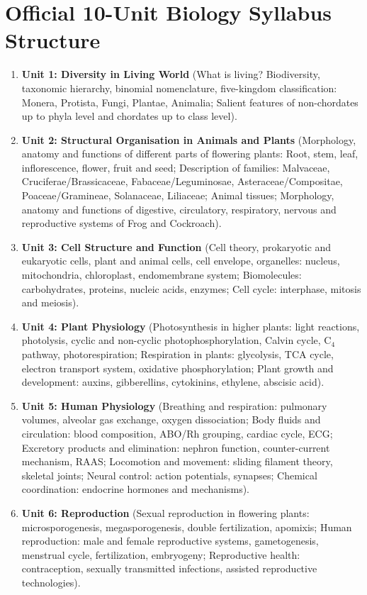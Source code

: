 \documentclass[10pt,twoside,openright]{book}
\begin{document}
\section*{Official 10-Unit Biology Syllabus Structure}

\begin{enumerate}[leftmargin=*]
  \item \textbf{Unit 1: Diversity in Living World} (What is living? Biodiversity, taxonomic hierarchy, binomial nomenclature, five-kingdom classification: Monera, Protista, Fungi, Plantae, Animalia; Salient features of non-chordates up to phyla level and chordates up to class level).
  \item \textbf{Unit 2: Structural Organisation in Animals and Plants} (Morphology, anatomy and functions of different parts of flowering plants: Root, stem, leaf, inflorescence, flower, fruit and seed; Description of families: Malvaceae, Cruciferae/Brassicaceae, Fabaceae/Leguminosae, Asteraceae/Compositae, Poaceae/Gramineae, Solanaceae, Liliaceae; Animal tissues; Morphology, anatomy and functions of digestive, circulatory, respiratory, nervous and reproductive systems of Frog and Cockroach).
  \item \textbf{Unit 3: Cell Structure and Function} (Cell theory, prokaryotic and eukaryotic cells, plant and animal cells, cell envelope, organelles: nucleus, mitochondria, chloroplast, endomembrane system; Biomolecules: carbohydrates, proteins, nucleic acids, enzymes; Cell cycle: interphase, mitosis and meiosis).
  \item \textbf{Unit 4: Plant Physiology} (Photosynthesis in higher plants: light reactions, photolysis, cyclic and non-cyclic photophosphorylation, Calvin cycle, C$_4$ pathway, photorespiration; Respiration in plants: glycolysis, TCA cycle, electron transport system, oxidative phosphorylation; Plant growth and development: auxins, gibberellins, cytokinins, ethylene, abscisic acid).
  \item \textbf{Unit 5: Human Physiology} (Breathing and respiration: pulmonary volumes, alveolar gas exchange, oxygen dissociation; Body fluids and circulation: blood composition, ABO/Rh grouping, cardiac cycle, ECG; Excretory products and elimination: nephron function, counter-current mechanism, RAAS; Locomotion and movement: sliding filament theory, skeletal joints; Neural control: action potentials, synapses; Chemical coordination: endocrine hormones and mechanisms).
  \item \textbf{Unit 6: Reproduction} (Sexual reproduction in flowering plants: microsporogenesis, megasporogenesis, double fertilization, apomixis; Human reproduction: male and female reproductive systems, gametogenesis, menstrual cycle, fertilization, embryogeny; Reproductive health: contraception, sexually transmitted infections, assisted reproductive technologies).

\end{enumerate}
\end{document}
